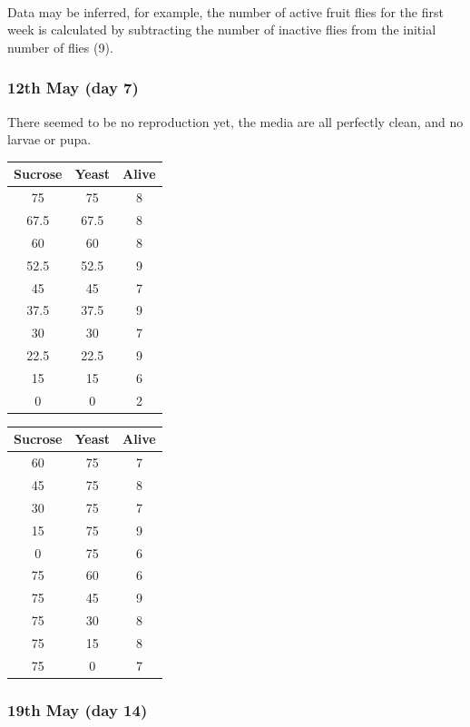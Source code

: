 \documentclass{article}
\begin{document}
\noindent\\
Data may be inferred, for example, the number of active fruit flies for the first week is calculated by subtracting the number of inactive flies from the initial number of flies (9).

\newpage
\subsubsection{12th May (day 7)}

There seemed to be no reproduction yet, the media are all perfectly clean, and no larvae or pupa.\\

{
\centering
\begin{tabular}{|c|c|c|}
  \hline
  Sucrose & Yeast & Alive\\
  \hline
  \hline
  75 & 75 & 8\\
  67.5 & 67.5 & 8\\
  60 & 60 & 8\\
  52.5 & 52.5 & 9\\
  45 & 45 & 7\\
  37.5 & 37.5 & 9\\
  30 & 30 & 7\\
  22.5 & 22.5 & 9\\
  15 & 15 & 6\\
  0 & 0 & 2\\
  \hline
\end{tabular}
\begin{tabular}{|c|c|c|}
  \hline
  Sucrose & Yeast & Alive\\
  \hline
  \hline
  60 & 75 & 7\\
  45 & 75 & 8\\
  30 & 75 & 7\\
  15 & 75 & 9\\
  0 & 75 & 6\\
  \hline
  75 & 60 & 6\\
  75 & 45 & 9\\
  75 & 30 & 8\\
  75 & 15 & 8\\
  75 & 0 & 7\\
  \hline
\end{tabular}
\par
}

\subsubsection{19th May (day 14)}
\end{document}

